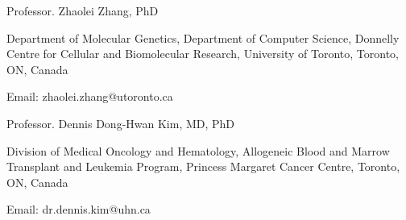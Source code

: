 


\begin{cventries}

\cventry
{} %
{Professor. Zhaolei Zhang, PhD} %
{} %
{} %
{\begin{cvitems}\vspace*{-0.35cm}
\item {Department of Molecular Genetics, Department of Computer Science, Donnelly Centre for Cellular and Biomolecular Research, University of Toronto, Toronto, ON, Canada}
\item{Email: zhaolei.zhang@utoronto.ca}
\end{cvitems}}

\cventry
{} %
{Professor. Dennis Dong-Hwan Kim, MD, PhD} %
{} %
{} %
{\begin{cvitems}\vspace*{-0.35cm}
\item {Division of Medical Oncology and Hematology, Allogeneic Blood and Marrow Transplant and Leukemia Program, Princess Margaret Cancer Centre, Toronto, ON, Canada}
\item{Email: dr.dennis.kim@uhn.ca}
\end{cvitems}}


\end{cventries}